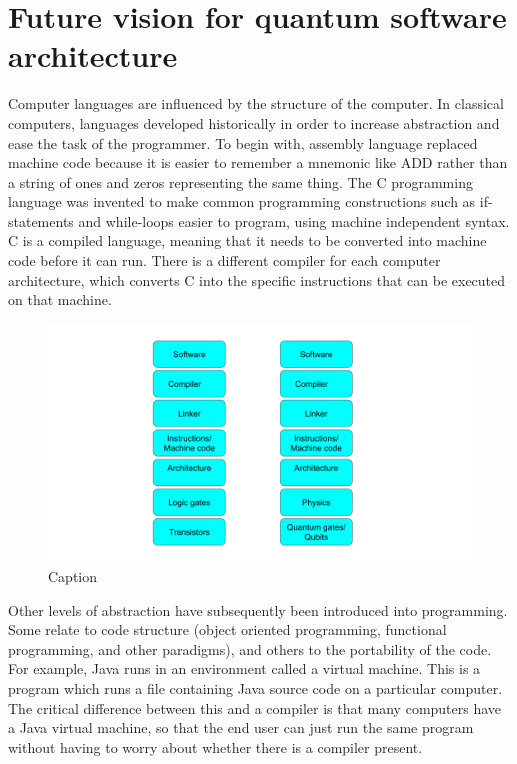 \section{Future vision for quantum software architecture}
\label{sec:future}

Computer languages are influenced by the structure of the computer. In classical computers, languages developed historically in order to increase abstraction and ease the task of the programmer. To begin with, assembly language replaced machine code because it is easier to remember a mnemonic like ADD rather than a string of ones and zeros representing the same thing. The C programming language was invented to make common programming constructions such as if-statements and while-loops easier to program, using machine independent syntax. C is a compiled language, meaning that it needs to be converted into machine code before it can run. There is a different compiler for each computer architecture, which converts C into the specific instructions that can be executed on that machine. 

\begin{figure}[H]
    \centering
    \includegraphics[width=\textwidth]{figures/impl/structureofcomp.png}
    \caption{Caption}
    \label{fig:cpuqpu}
\end{figure}

Other levels of abstraction have subsequently been introduced into programming. Some relate to code structure (object oriented programming, functional programming, and other paradigms), and others to the portability of the code. For example, Java runs in an environment called a virtual machine. This is a program which runs a file containing Java source code on a particular computer. The critical difference between this and a compiler is that many computers have a Java virtual machine, so that the end user can just run the same program without having to worry about whether there is a compiler present. 

